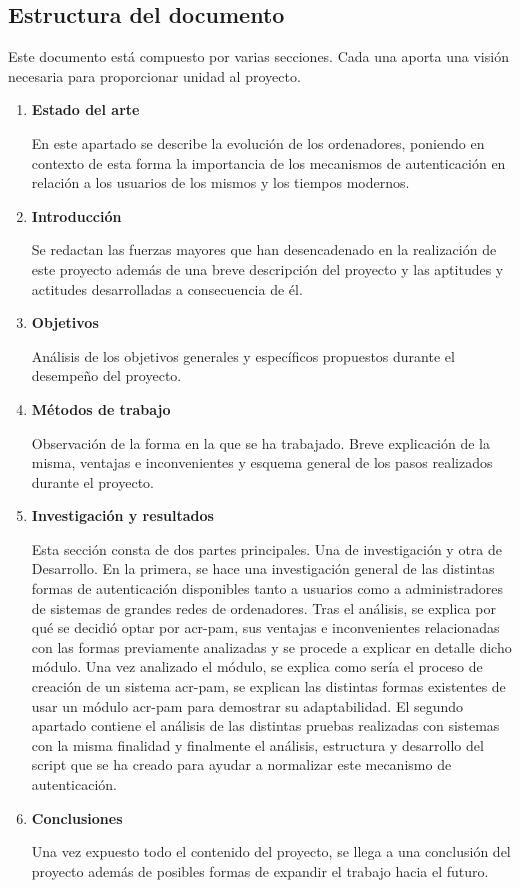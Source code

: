 \documentclass[twoside, titlepage, 12pt, a4paper]{article}
\begin{document}
\subsection{Estructura del documento}
Este documento está compuesto por varias secciones. Cada una aporta una visión necesaria para proporcionar unidad al proyecto.
\begin{enumerate}
	\item{\textbf{Estado del arte}}\par
		En este apartado se describe la evolución de los ordenadores, poniendo en contexto de esta forma la importancia de los mecanismos de autenticación en relación a los usuarios de los mismos y los tiempos modernos.
	\item{\textbf{Introducción}}\par
		Se redactan las fuerzas mayores que han desencadenado en la realización de este proyecto además de una breve descripción del proyecto y las aptitudes y actitudes desarrolladas a consecuencia de él.
	\item{\textbf{Objetivos}}\par
		Análisis de los objetivos generales y específicos propuestos durante el desempeño del proyecto.
	\item{\textbf{Métodos de trabajo}}\par
		Observación de la forma en la que se ha trabajado. Breve explicación de la misma, ventajas e inconvenientes y esquema general de los pasos realizados durante el proyecto.
	\item{\textbf{Investigación y resultados}}\par
		Esta sección consta de dos partes principales. Una de investigación y otra de Desarrollo. En la primera, se hace una investigación general de las distintas formas de autenticación disponibles tanto a usuarios como a administradores de sistemas de grandes redes de ordenadores. Tras el análisis, se explica por qué se decidió optar por \gls{acr-pam}, sus ventajas e inconvenientes relacionadas con las formas previamente analizadas y se procede a explicar en detalle dicho módulo. Una vez analizado el módulo, se explica como sería el proceso de creación de un sistema \gls{acr-pam}, se explican las distintas formas existentes de usar un módulo \gls{acr-pam} para demostrar su adaptabilidad. El segundo apartado contiene el análisis de las distintas pruebas realizadas con sistemas con la misma finalidad y finalmente el análisis, estructura y desarrollo del \gls{script} que se ha creado para ayudar a normalizar este mecanismo de autenticación.
	\item{\textbf{Conclusiones}}\par
		Una vez expuesto todo el contenido del proyecto, se llega a una conclusión del proyecto además de posibles formas de expandir el trabajo hacia el futuro.
\end{enumerate}
\clearpage
\end{document}
